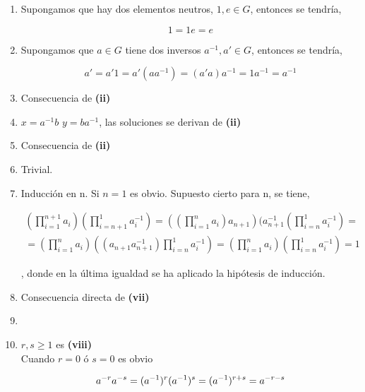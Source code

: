 \documentclass{article}
\begin{document}
\begin{enumerate}
\item Supongamos que hay dos elementos neutros, $1,e \in G$, entonces se tendría,

\begin{equation*}
1=1e=e
\end{equation*}

\item Supongamos que $a \in G$ tiene dos inversos $a^{-1}, a' \in G$, entonces se tendría,

\begin{equation*}
a'=a'1=a'(aa^{-1})=(a'a)a^{-1}=1a^{-1}=a^{-1}
\end{equation*}

\item Consecuencia de \textbf{(ii)}

\item $x=a^{-1}b$ $y=ba^{-1}$, las soluciones se derivan de \textbf{(ii)}

\item Consecuencia de \textbf{(ii)}

\item Trivial.

\item Inducción en n. Si $n=1$ es obvio. Supuesto cierto para n, se tiene,

\begin{equation*}
\begin{split}
(\prod_{i=1}^{n+1} a_i)(\prod_{i=n+1}^1 a_i^{-1})=((\prod_{i=1}^n a_i)a_{n+1})(a_{n+1}^{-1}(\prod_{i=n}^1 a_i^{-1})= \\
= (\prod_{i=1}^n a_i)((a_{n+1}a_{n+1}^{-1})\prod_{i=n}^1 a_i^{-1})=(\prod_{i=1}^n a_i)(\prod_{i=n}^1 a_i^{-1})=1
\end{split}
\end{equation*}

, donde en la última igualdad se ha aplicado la hipótesis de inducción.

\item Consecuencia directa de \textbf{(vii)}

\item

\item $r,s \geq 1$ es \textbf{(viii)} \\

Cuando $r=0$ ó $s=0$ es obvio

\begin{equation*}
a^{-r}a^{-s}=(a^{-1})^{r}(a^{-1})^s=(a^{-1})^{r+s}=a^{-r-s} \\
\end{equation*} 


\end{enumerate}
\end{document}
